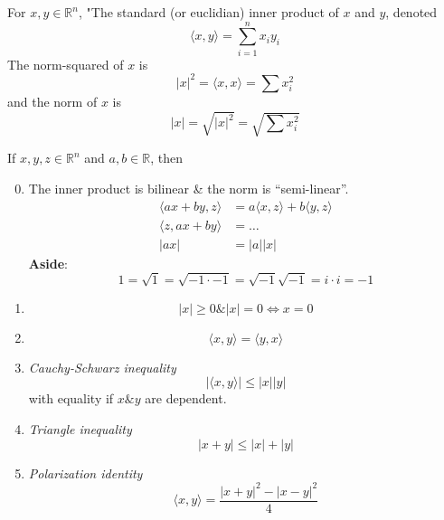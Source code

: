 \documentclass[a4paper]{article}
\numberwithin{equation}{section}
\begin{document}
\begin{definition}
    For $x, y\in\mathbb R^n$, "The standard (or euclidian) inner product of $x$ and $y$, denoted 
    \begin{equation}
        \langle x, y\rangle = \sum_{i=1}^n x_iy_i
    \end{equation}
    The norm-squared of $x$ is 
    \begin{equation}
        |x|^2=\langle x, x\rangle = \sum x_i^2
    \end{equation}
    and the norm of $x$ is
    \begin{equation}
        |x|=\sqrt{|x|^2} = \sqrt{\sum x_i^2}
    \end{equation}
\end{definition}

\begin{proposition}
    If $x, y, z\in\mathbb R^n$ and $a, b\in\mathbb R$, then
    \begin{enumerate}
        \setcounter{enumi}{-1}
        \item The inner product is bilinear \& the norm is ``semi-linear''.
        \begin{align}
                \langle ax+by,z \rangle &= a\langle x, z\rangle + b\langle y, z\rangle\\
            \langle z, ax+by \rangle &= \dots\\
            |ax|&=|a||x|
        \end{align}
        \textbf{Aside}: 
        \begin{equation}
            1=\sqrt 1=\sqrt{-1\cdot-1}=\sqrt{-1}\sqrt{-1}=i\cdot i=-1
        \end{equation}
        \item \begin{equation}
            |x|\geq 0 \& |x|=0\iff x=0
        \end{equation}
        \item \begin{equation}
            \langle x,y\rangle = \langle y,x \rangle
        \end{equation}
        \item \textit{Cauchy-Schwarz inequality}
        \begin{equation}
            |\langle x,y\rangle|\leq|x||y|
        \end{equation}
        with equality if $x\&y$ are dependent. 
        \item \textit{Triangle inequality}
        \begin{equation}
            |x+y|\leq |x|+|y|
        \end{equation}
        \item \textit{Polarization identity}
        \begin{equation}
            \langle x,y\rangle = \frac{|x+y|^2-|x-y|^2}{4}
        \end{equation}
    \end{enumerate}


\end{proposition}
\end{document}
